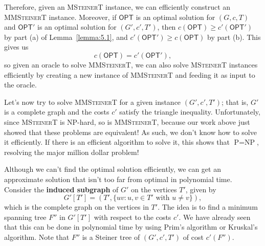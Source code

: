 Therefore, given an \textsc{MSteinerT} instance, we can efficiently construct 
an \textsc{MMSteinerT} instance. Moreover, if $\textsf{OPT}$ is an optimal solution for 
$(G, c, T)$ and $\textsf{OPT}'$ is an optimal solution for $(G', c', T')$, 
then $c(\textsf{OPT}) \geq c'(\textsf{OPT}')$ by part (a) of Lemma~\ref{lemma:5.1},
and $c'(\textsf{OPT}') \geq c(\textsf{OPT})$ by part (b). This gives us 
\[ c(\textsf{OPT}) = c'(\textsf{OPT}'), \] 
so given an oracle to solve \textsc{MMSteinerT}, we can also solve 
\textsc{MSteinerT} instances efficiently by creating a new instance 
of \textsc{MMSteinerT} and feeding it as input to the oracle.

Let's now try to solve \textsc{MMSteinerT} for a given instance $(G', c', T')$;
that is, $G'$ is a complete graph and the costs $c'$ satisfy the triangle 
inequality. Unfortunately, since \textsc{MSteinerT} is NP-hard, so is 
\textsc{MMSteinerT}, because our work above just showed that these 
problems are equivalent! As such, we don't know how 
to solve it efficiently. If there is an efficient algorithm to solve it, this 
shows that $\text{P} = \text{NP}$, resolving the major million dollar problem!

Although we can't find the optimal solution efficiently, we can get an 
approximate solution that isn't too far from optimal in polynomial time. 
Consider the {\bf induced subgraph} of $G'$ on the vertices $T'$, given by 
\[ G'[T'] = (T', \{uv : u, v \in T' \text{ with } u\neq v\}), \] 
which is the complete graph on the vertices in $T'$. The idea is to find a 
minimum spanning tree $F''$ in $G'[T']$ with respect to the costs $c'$. 
We have already seen that this can be done in polynomial time by using 
Prim's algorithm or Kruskal's algorithm. Note that $F''$ is a Steiner 
tree of $(G', c', T')$ of cost $c'(F'')$. 

